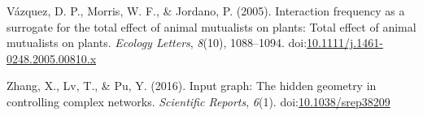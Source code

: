 \documentclass[a4paper]{artikel1}
\theoremstyle{definition}
\theoremstyle{definition}
\theoremstyle{definition}
\theoremstyle{remark}
\begin{document}
\hypertarget{ref-vazquez_interaction_2005}{}
Vázquez, D. P., Morris, W. F., \& Jordano, P. (2005). Interaction
frequency as a surrogate for the total effect of animal mutualists on
plants: Total effect of animal mutualists on plants. \emph{Ecology
Letters}, \emph{8}(10), 1088--1094.
doi:\href{https://doi.org/10.1111/j.1461-0248.2005.00810.x}{10.1111/j.1461-0248.2005.00810.x}

\hypertarget{ref-zhang_input_2016}{}
Zhang, X., Lv, T., \& Pu, Y. (2016). Input graph: The hidden geometry in
controlling complex networks. \emph{Scientific Reports}, \emph{6}(1).
doi:\href{https://doi.org/10.1038/srep38209}{10.1038/srep38209}
\end{document}
